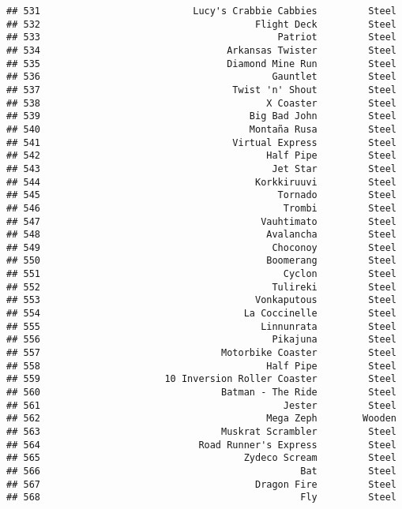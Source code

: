\documentclass[
]{article}
\begin{document}
\begin{verbatim}
## 531                           Lucy's Crabbie Cabbies         Steel
## 532                                      Flight Deck         Steel
## 533                                          Patriot         Steel
## 534                                 Arkansas Twister         Steel
## 535                                 Diamond Mine Run         Steel
## 536                                         Gauntlet         Steel
## 537                                  Twist 'n' Shout         Steel
## 538                                        X Coaster         Steel
## 539                                     Big Bad John         Steel
## 540                                     Montaña Rusa         Steel
## 541                                  Virtual Express         Steel
## 542                                        Half Pipe         Steel
## 543                                         Jet Star         Steel
## 544                                      Korkkiruuvi         Steel
## 545                                          Tornado         Steel
## 546                                           Trombi         Steel
## 547                                       Vauhtimato         Steel
## 548                                        Avalancha         Steel
## 549                                         Choconoy         Steel
## 550                                        Boomerang         Steel
## 551                                           Cyclon         Steel
## 552                                         Tulireki         Steel
## 553                                      Vonkaputous         Steel
## 554                                    La Coccinelle         Steel
## 555                                       Linnunrata         Steel
## 556                                         Pikajuna         Steel
## 557                                Motorbike Coaster         Steel
## 558                                        Half Pipe         Steel
## 559                      10 Inversion Roller Coaster         Steel
## 560                                Batman - The Ride         Steel
## 561                                           Jester         Steel
## 562                                        Mega Zeph        Wooden
## 563                                Muskrat Scrambler         Steel
## 564                            Road Runner's Express         Steel
## 565                                    Zydeco Scream         Steel
## 566                                              Bat         Steel
## 567                                      Dragon Fire         Steel
## 568                                              Fly         Steel

\end{verbatim}
\end{document}
